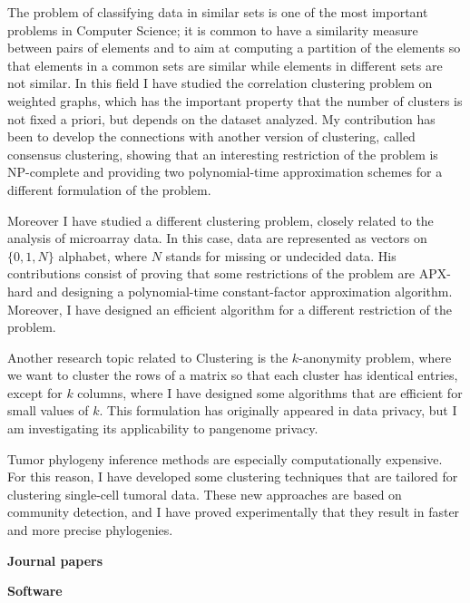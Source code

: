 \documentclass[11pt,a4paper,roman]{moderncv}
\begin{document}
The problem of classifying data in similar sets is one of the most
important problems in Computer Science; it is common to have a
similarity measure between pairs of elements and to aim at computing a
partition of the elements so that elements in a common sets are similar
while elements in different sets are not similar. In this field
I have studied the correlation clustering
problem on weighted graphs, which has the important property that the number of
clusters is not fixed a priori, but depends on the dataset analyzed.
My contribution has been to develop the connections with another version of
clustering, called consensus clustering, showing that an
interesting restriction of the problem is NP-complete and providing two
polynomial-time approximation schemes for a different formulation of the
problem.

Moreover I have studied a different clustering problem, closely related
to the analysis of microarray data. In this case, data are represented
as vectors on \(\{0,1,N\}\) alphabet, where \(N\) stands for missing or
undecided data. His contributions consist of proving that some
restrictions of the problem are APX-hard and designing a polynomial-time
constant-factor approximation algorithm. Moreover, I have designed an
efficient algorithm for a different restriction of the problem.

Another research topic related to Clustering is the \(k\)-anonymity problem,
where we want to cluster the rows of a matrix so that each cluster has identical
entries, except for \(k\) columns, where I have designed some algorithms that
are efficient for small values of \(k\).
This formulation has originally appeared in data privacy, but I am investigating
its applicability to pangenome privacy.


Tumor phylogeny inference methods are especially computationally expensive.
For this reason, I have developed some clustering techniques that are tailored
for clustering single-cell tumoral data.
These new approaches are based on community detection, and I have proved
experimentally that they result in faster and more precise phylogenies.


\textbf{Journal papers}

\cite{10.1093/gigascience/giac119}
\cite{DBLP:journals/titb/CiccolellaPBV21}
\cite{DBLP:journals/jco/BonizzoniVDP13}
\cite{DBLP:journals/tcs/BonizzoniVD12}
\cite{DBLP:journals/jco/BonizzoniVD11}
\cite{DBLP:journals/algorithmica/BonizzoniVDM10}
\cite{DBLP:journals/jcss/BonizzoniVDJ08}

\textbf{Software}
\end{document}
